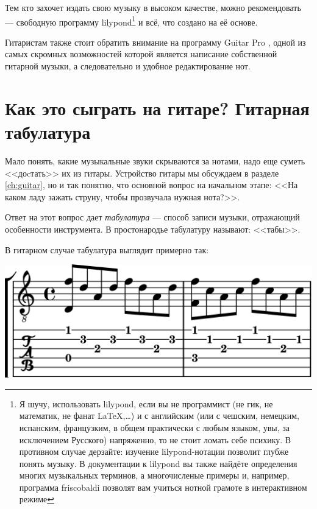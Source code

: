 Тем кто захочет издать свою музыку в высоком качестве, можно рекомендовать \cite{url:lilypond} --- свободную программу lilypond\footnote{Я шучу, использовать lilypond, если вы не программист (не гик, не математик, не фанат \LaTeX,\ldots) и с английским (или с чешским, немецким, испанским, французким, в общем практически с любым языком, увы, за исключением Русского) напряженно, то не стоит ломать себе психику. В противном случае дерзайте: изучение lilypond-нотации позволит глубже понять музыку. В документации к lilypond вы также найдёте определения многих музыкальных терминов, а многочисленые примеры и, например, программа friscobaldi позволят вам учиться нотной грамоте в интерактивном режиме} и всё, что создано на её основе. 

Гитаристам также стоит обратить внимание на программу Guitar Pro \cite{url:guitarpro}, одной из самых скромных возможностей которой является написание собственной гитарной музыки, а следовательно и удобное редактирование нот.


\section{Как это сыграть на гитаре? Гитарная табулатура}

Мало понять, какие музыкальные звуки скрываются за нотами, надо еще суметь <<доcтать>> их из гитары. Устройство гитары мы обсуждаем в разделе \ref{ch:guitar}, но и так понятно, что основной вопрос на начальном этапе: <<На каком ладу зажать струну, чтобы прозвучала нужная нота?>>. 

Ответ на этот вопрос дает \emph{табулатура} --- способ записи музыки, отражающий особенности инструмента. В простонародье табулатуру называют: <<табы>>.

В гитарном случае табулатура выглядит примерно так:
\begin{center}
    \includegraphics{fig/notes/tab}
\end{center}

